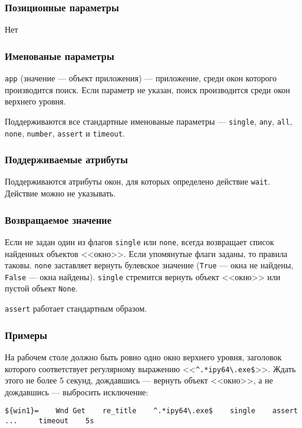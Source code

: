 \documentclass[11pt]{book} %
\begin{document}
\subsubsection*{Позиционные параметры}

Нет

\subsubsection*{Именованые параметры} 
\verb"app" (значение --- объект приложения) --- приложение, среди окон которого производится поиск. Если параметр не указан, поиск производится среди окон верхнего уровня.

Поддерживаются все стандартные именованые параметры --- \verb"single", \verb|any|, \verb|all|, \verb|none|, \verb|number|, \verb"assert" и \verb"timeout".


\subsubsection*{Поддерживаемые атрибуты} 

Поддерживаются атрибуты окон, для которых определено действие \verb|wait|. Действие можно не указывать.

\subsubsection*{Возвращаемое значение}
Если не задан один из флагов \verb"single" или \verb"none", всегда возвращает список найденных объектов <<окно>>. Если упомянутые флаги заданы, то правила таковы. \verb"none" заставляет вернуть булевское значение (\verb"True" --- окна не найдены, \verb"False" --- окна найдены). \verb"single" стремится вернуть объект <<окно>> или пустой объект \verb"None".

\verb"assert" работает стандартным образом.


\subsubsection*{Примеры}
На рабочем столе должно быть ровно одно окно верхнего уровня, заголовок которого соответствует регулярному выражению <<\verb"^.*ipy64\.exe$">>. Ждать этого не более 5 секунд, дождавшись --- вернуть объект <<окно>>, а не дождавшись --- выбросить исключение:

\begin{verbatim}
${win1}=    Wnd Get    re_title    ^.*ipy64\.exe$    single    assert
...     timeout    5s
\end{verbatim}
\end{document}
